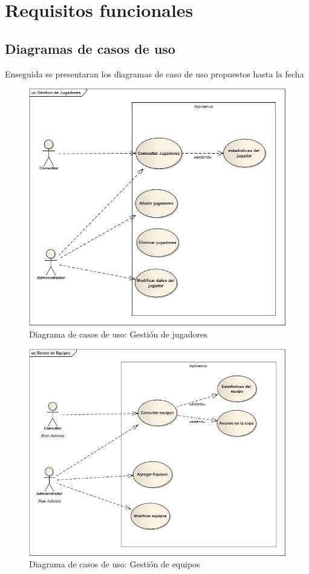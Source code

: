 \section{Requisitos funcionales}


\subsection{Diagramas de casos de uso}
Enseguida se presentaran los diagramas de caso de uso propuestos hasta la fecha

\begin{figure}[H]
	\centering
	\includegraphics[width=1\linewidth]{Designe/imgs/gestionJ}
	\caption{Diagrama de casos de uso: Gestión de jugadores}
	\label{fig:gestionj}
\end{figure}

\begin{figure}[H]
	\centering
	\includegraphics[width=1\linewidth]{Designe/imgs/gestionE}
	\caption{Diagrama de casos de uso: Gestión de equipos}
	\label{fig:gestionE}
\end{figure}

